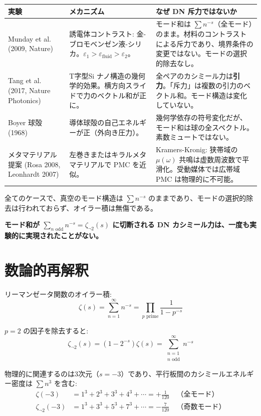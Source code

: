 \documentclass[11pt,a4paper]{article}
\begin{document}
\begin{center}
\renewcommand{\arraystretch}{1.3}
\begin{tabular}{p{3cm}p{3.5cm}p{5.5cm}}
\toprule
実験 & メカニズム & なぜ DN 斥力ではないか \\
\midrule
Munday et al. (2009, Nature) & 誘電体コントラスト: 金-ブロモベンゼン液-シリカ。$\varepsilon_1 > \varepsilon_{\text{fluid}} > \varepsilon_2$。 & モード和は $\sum n^{-s}$（全モード）のまま。材料のコントラストによる斥力であり、境界条件の変更ではない。モードの選択的除去なし。 \\
Tang et al. (2017, Nature Photonics) & T字型Si ナノ構造の幾何学的効果。横方向スライドで力のベクトル和が正に。 & 全ペアのカシミール力は\textbf{引力}。「斥力」は複数の引力のベクトル和。モード構造は変化していない。 \\
Boyer 球殻 (1968) & 導体球殻の自己エネルギーが正（外向き圧力）。 & 幾何学依存の符号変化だが、モード和は球の全スペクトル。素数ミュートではない。 \\
メタマテリアル提案 (Rosa 2008, Leonhardt 2007) & 左巻きまたはキラルメタマテリアルで PMC を近似。 & Kramers-Kronig: 狭帯域の $\mu(\omega)$ 共鳴は虚数周波数で平滑化。受動媒体では広帯域 PMC は物理的に不可能。 \\
\bottomrule
\end{tabular}
\end{center}

全てのケースで、真空のモード構造は $\sum n^{-s}$ のままであり、モードの選択的除去は行われておらず、オイラー積は無傷である。

\textbf{モード和が $\sum_{n\text{ odd}} n^{-s} = \zeta_{\neg 2}(s)$ に切断される DN カシミール力は、一度も実験的に実現されたことがない。}

\section{数論的再解釈}

リーマンゼータ関数のオイラー積:
$$\zeta(s) = \sum_{n=1}^{\infty} n^{-s} = \prod_{p\text{ prime}} \frac{1}{1-p^{-s}}$$

$p=2$ の因子を除去すると:
$$\zeta_{\neg 2}(s) = (1-2^{-s})\zeta(s) = \sum_{\substack{n=1 \\ n\text{ odd}}}^{\infty} n^{-s}$$

物理的に関連するのは3次元（$s=-3$）であり、平行板間のカシミールエネルギー密度は $\sum n^3$ を含む:
\begin{align}
\zeta(-3) &= 1^3+2^3+3^3+4^3+\cdots = +\tfrac{1}{120} \quad\text{（全モード）}\\
\zeta_{\neg 2}(-3) &= 1^3+3^3+5^3+7^3+\cdots = -\tfrac{7}{120} \quad\text{（奇数モード）}
\end{align}
\end{document}
